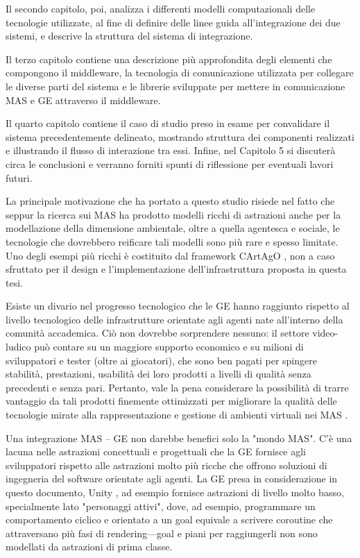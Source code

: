 \medskip

Il secondo capitolo, poi, analizza i differenti modelli computazionali delle tecnologie utilizzate, al fine di definire delle linee guida all'integrazione dei due sistemi, e descrive la struttura del sistema di integrazione.

\medskip

Il terzo capitolo contiene una descrizione più approfondita degli elementi che compongono il middleware, la tecnologia di comunicazione utilizzata per collegare le diverse parti del sistema e le librerie sviluppate per mettere in comunicazione MAS e GE attraverso il middleware.

\medskip

Il quarto capitolo contiene il caso di studio preso in esame per convalidare il sistema precedentemente delineato, mostrando struttura dei componenti realizzati e illustrando il flusso di interazione tra essi. Infine, nel Capitolo 5 si discuterà circa le conclusioni e verranno forniti spunti di riflessione per eventuali lavori futuri.

\medskip

La principale motivazione che ha portato a questo studio risiede nel fatto che seppur la ricerca sui MAS ha prodotto modelli ricchi di astrazioni anche per la modellazione della dimensione ambientale, oltre a quella agentesca e sociale, le tecnologie che dovrebbero reificare tali modelli sono più rare e spesso limitate. Uno degli esempi più ricchi è costituito dal framework CArtAgO \cite{cartago}, non a caso sfruttato per il design e l'implementazione dell'infrastruttura proposta in questa tesi.

\medskip

Esiste un divario nel progresso tecnologico che le GE hanno raggiunto rispetto al livello tecnologico delle infrastrutture orientate agli agenti nate all'interno della comunità accademica. Ciò non dovrebbe sorprendere nessuno: il settore video-ludico può contare su un maggiore supporto economico e su milioni di sviluppatori e tester (oltre ai giocatori), che sono ben pagati per spingere stabilità, prestazioni, usabilità dei loro prodotti a livelli di qualità senza precedenti e senza pari. Pertanto, vale la pena considerare la possibilità di trarre vantaggio da tali prodotti finemente ottimizzati per migliorare la qualità delle tecnologie mirate alla rappresentazione e gestione di ambienti virtuali nei MAS \cite{ge-architecture}.

\medskip

Una integrazione MAS -- GE non darebbe benefici solo la "mondo MAS". C'è una lacuna nelle astrazioni concettuali e progettuali che la GE fornisce agli sviluppatori rispetto alle astrazioni molto più ricche che offrono soluzioni di ingegneria del software orientate agli agenti. La GE presa in considerazione in questo documento, Unity \cite{unity}, ad esempio fornisce astrazioni di livello molto basso, specialmente lato "personaggi attivi", dove, ad esempio, programmare un comportamento ciclico e orientato a un goal equivale a scrivere coroutine che attraversano più fasi di rendering---goal e piani per raggiungerli non sono modellati da astrazioni di prima classe. 

